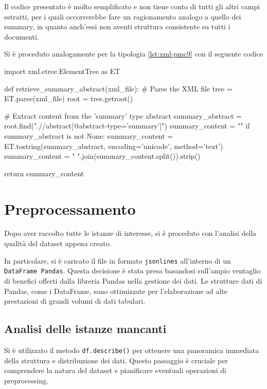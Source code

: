 \documentclass[12pt,a4paper,twoside,openright]{book}
\begin{document}
Il codice presentato è molto semplificato e non tiene conto di tutti gli altri campi estratti, per i quali occorrerebbe fare un ragionamento analogo a quello dei summary, in quanto anch'essi non aventi struttura consistente su tutti i documenti.

Si è proceduto analogamente per la tipologia \ref{lst:xml-pmc9} con il seguente codice 

\begin{python}[caption={Python script per estrarre l'abstract di tipo 'summary'.}, label={lst:py-pmc9}]
import xml.etree.ElementTree as ET

def retrieve_summary_abstract(xml_file):
    # Parse the XML file
    tree = ET.parse(xml_file)
    root = tree.getroot()

    # Extract content from the 'summary' type abstract
    summary_abstract = root.find(".//abstract[@abstract-type='summary']")
    summary_content = ""
    if summary_abstract is not None:
        summary_content = ET.tostring(summary_abstract, encoding='unicode', method='text')
        summary_content = " ".join(summary_content.split()).strip() 

    return summary_content
\end{python}

\section{Preprocessamento}

Dopo aver raccolto tutte le istanze di interesse, si è proceduto con l'analisi della qualità del dataset appena creato.

In particolare, si è caricato il file in formato \texttt{jsonlines} all'interno di un \texttt{DataFrame Pandas}. Questa decisione è stata presa basandosi sull'ampio ventaglio di benefici offerti dalla libreria Pandas nella gestione dei dati. Le strutture dati di Pandas, come i DataFrame, sono ottimizzate per l'elaborazione ad alte prestazioni di grandi volumi di dati tabulari.


\subsection{Analisi delle istanze mancanti}
Si è utilizzato il metodo \texttt{df.describe()} per ottenere una panoramica immediata della struttura e distribuzione dei dati. Questo passaggio è cruciale per comprendere la natura del dataset e pianificare eventuali operazioni di preprocessing.
\end{document}
